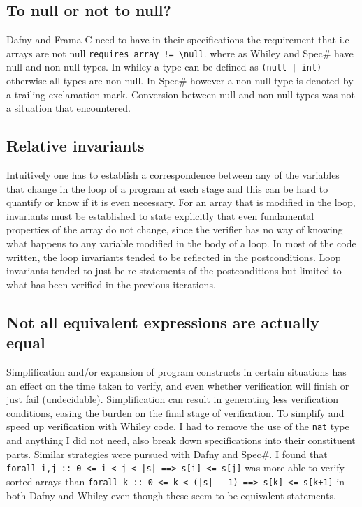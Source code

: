 \documentclass[10pt]{article} %
\begin{document}
\subsection{To null or not to null?}
Dafny and Frama-C need to have in their specifications the requirement that i.e arrays are not null \verb/requires array != \null/. where as Whiley and Spec\# have null and non-null types. In whiley a type can be defined as \verb/(null | int)/ otherwise all types are non-null. In Spec\# however a non-null type is denoted by a trailing exclamation mark. Conversion between null and non-null types was not a situation that encountered.

\subsection{Relative invariants}
Intuitively one has to establish a correspondence between any of the variables that change in the loop of a program at each stage and this can be hard to quantify or know if it is even necessary. For an array that is modified in the loop, invariants must be established to state explicitly that even fundamental properties of the array do not change, since the verifier has no way of knowing what happens to any variable modified in the body of a loop. In most of the code written, the loop invariants tended to be reflected in the postconditions. Loop invariants tended to just be re-statements of the postconditions but limited to what has been verified in the previous iterations. 

\subsection{Not all equivalent expressions are actually equal}
Simplification and/or expansion of program constructs in certain situations has an effect on the time taken to verify, and even whether verification will finish or just fail (undecidable). Simplification can result in generating less verification conditions, easing the burden on the final stage of verification. To simplify and speed up verification with Whiley code, I had to remove the use of the \verb/nat/ type and anything I did not need, also break down specifications into their constituent parts. Similar strategies were pursued with Dafny and Spec\#. I found that \verb/forall i,j :: 0 <= i < j < |s| ==> s[i] <= s[j]/ was more able to verify sorted arrays than \verb/forall k :: 0 <= k < (|s| - 1) ==> s[k] <= s[k+1]/ in both Dafny and Whiley even though these seem to be equivalent statements.
\end{document}
